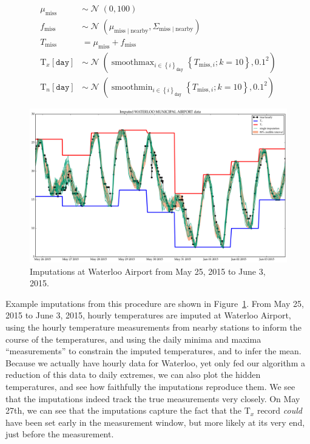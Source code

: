 \documentclass[letter]{article}
\makeatletter
\def\maxwidth{\ifdim\Gin@nat@width>\linewidth\linewidth
\else\Gin@nat@width\fi}
\let\Oldincludegraphics\includegraphics
\renewcommand{\includegraphics}[1]{\Oldincludegraphics[width=.8\maxwidth]{#1}}
\newcommand{\genericdel}[3]{%
      \left#1#3\right#2
    }
\newcommand{\del}[1]{\genericdel(){#1}}
\newcommand{\sbr}[1]{\genericdel[]{#1}}
\newcommand{\cbr}[1]{\genericdel\{\}{#1}}
\DeclareMathOperator{\normal}{\mathcal{N}}
\newcommand{\T}{\mathrm{T}}
\newcommand{\Tn}{\T_{n}}
\newcommand{\Tx}{\T_{x}}
\newcommand{\miss}{\mathrm{miss}}
\newcommand{\obs}{\mathrm{nearby}}
\DeclareMathOperator*{\softmax}{smoothmax}
\DeclareMathOperator*{\softmin}{smoothmin}
\newcommand{\iday}{\mathtt{day}}
\newcommand{\dayset}[1]{\cbr{i}_{#1}}
\newcommand{\eqlabel}[1]{\label{#1}}
\makeatother
\begin{document}
\begin{equation}
\eqlabel{eq:smoothed_model}
\begin{split}
    \mu_\miss &\sim \normal\del{0,100} \\
    f_\miss &\sim \normal\del{\mu_{\miss \mid \obs}, \Sigma_{\miss \mid \obs}} \\
    T_\miss &= \mu_\miss + f_\miss \\
    \Tx\sbr{\iday} &\sim \normal\del{\softmax_{i \in \dayset{\iday}} \cbr{ T_{\miss,i}; k=10}, 0.1^2} \\
    \Tn\sbr{\iday} &\sim \normal\del{\softmin_{i \in \dayset{\iday}} \cbr{ T_{\miss,i}; k=10}, 0.1^2}
\end{split}
\end{equation}
    


        \begin{figure}
\centering
\includegraphics{figures/imputations_SEonly.png}
\caption{\label{fig:imputations_SEonly}Imputations at Waterloo Airport from May 25, 2015 to June 3, 2015.}
\end{figure}
    


        Example imputations from this procedure are shown in Figure~\ref{fig:imputations_SEonly}.
From May 25, 2015 to June 3, 2015, hourly temperatures are imputed at Waterloo Airport, using the hourly temperature measurements from nearby stations to inform the course of the temperatures, and using the daily minima and maxima ``measurements'' to constrain the imputed temperatures, and to infer the mean.
Because we actually have hourly data for Waterloo, yet only fed our algorithm a reduction of this data to daily extremes, we can also plot the hidden temperatures, and see how faithfully the imputations reproduce them.
We see that the imputations indeed track the true measurements very closely.
On May 27th, we can see that the imputations capture the fact that the \(\Tx\) record \emph{could} have been set early in the measurement window, but more likely at its very end, just before the measurement.
    
\end{document}
